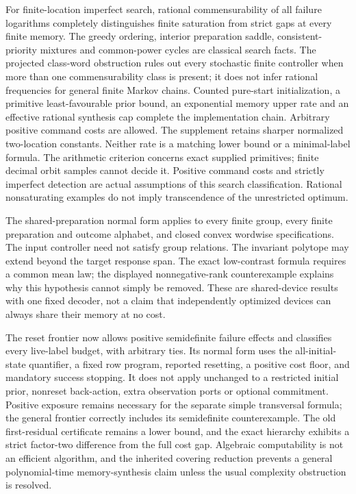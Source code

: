 For finite-location imperfect search, rational commensurability of all
failure logarithms completely distinguishes finite saturation from
strict gaps at every finite memory.  The greedy ordering, interior
preparation saddle, consistent-priority mixtures and common-power
cycles are classical search facts.  The projected class-word
obstruction rules out every stochastic finite controller when more
than one commensurability class is present; it does not infer rational
frequencies for general finite Markov chains.  Counted pure-start
initialization, a primitive least-favourable prior bound, an exponential
memory upper rate and an effective rational synthesis cap complete the
implementation chain.  Arbitrary positive command costs are allowed.
The supplement retains sharper normalized two-location constants.
Neither rate is a matching lower bound or a minimal-label formula.
The arithmetic criterion concerns exact supplied primitives; finite
decimal orbit samples cannot decide it.  Positive command costs and
strictly imperfect detection are actual assumptions of this search
classification.  Rational nonsaturating examples do not imply
transcendence of the unrestricted optimum.

The shared-preparation normal form applies to every finite group, every
finite preparation and outcome alphabet, and closed convex wordwise
specifications.  The input controller need not satisfy group relations.
The invariant polytope may extend beyond the target response span.
The exact low-contrast formula requires a common mean law; the displayed
nonnegative-rank counterexample explains why this hypothesis cannot
simply be removed.  These are shared-device results with one fixed
decoder, not a claim that independently optimized devices can always
share their memory at no cost.

The reset frontier now allows positive semidefinite failure effects
and classifies every live-label budget, with arbitrary ties.  Its normal
form uses the all-initial-state quantifier, a fixed row program, reported
resetting, a positive cost floor, and mandatory success stopping.  It
does not apply unchanged to a restricted initial prior, nonreset
back-action, extra observation ports or optional commitment.  Positive
exposure remains necessary for the separate simple transversal formula;
the general frontier correctly includes its semidefinite counterexample.
The old first-residual certificate remains a lower bound, and the exact
hierarchy exhibits a strict factor-two difference from the full cost gap.
Algebraic computability is not an efficient algorithm, and the inherited
covering reduction prevents a general polynomial-time memory-synthesis
claim unless the usual complexity obstruction is resolved.

